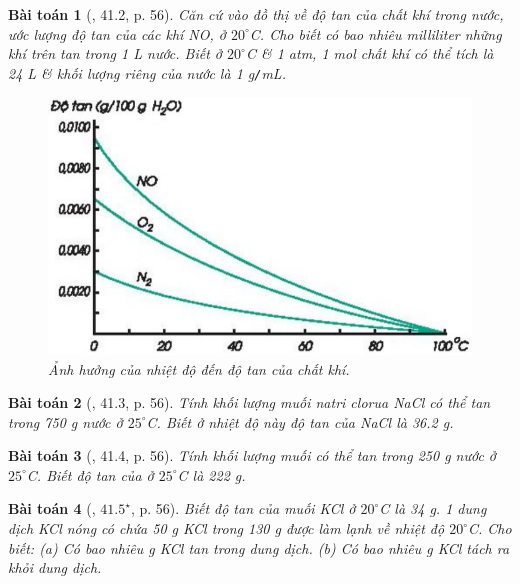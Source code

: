 \documentclass{article}
\newtheorem{baitoan}{Bài toán}
\begin{document}
\begin{baitoan}[\cite{SBT_Hoa_Hoc_8}, 41.2, p. 56]
	Căn cứ vào đồ thị về độ tan của chất khí trong nước, ước lượng độ tan của các khí \emph{NO, } ở $20^\circ$\emph{C}. Cho biết có bao nhiêu milliliter những khí trên tan trong \emph{1 L} nước. Biết ở $20^\circ$\emph{C} \& \emph{1 atm, 1 mol} chất khí có thể tích là \emph{24 L} \& khối lượng riêng của nước là \emph{1 g\texttt{/}mL}.	
	\begin{figure}[H]
		\centering
		\includegraphics[scale=0.3]{nhiet_do_do_tan_chat_khi}
		\caption{Ảnh hưởng của nhiệt độ đến độ tan của chất khí.}
	\end{figure}
\end{baitoan}

\begin{baitoan}[\cite{SBT_Hoa_Hoc_8}, 41.3, p. 56]
	Tính khối lượng muối natri clorua \emph{NaCl} có thể tan trong \emph{750 g} nước ở $25^\circ$\emph{C}. Biết ở nhiệt độ này độ tan của \emph{NaCl} là \emph{36.2 g}.
\end{baitoan}

\begin{baitoan}[\cite{SBT_Hoa_Hoc_8}, 41.4, p. 56]
	Tính khối lượng muối \emph{} có thể tan trong \emph{250 g} nước ở $25^\circ$\emph{C}. Biết độ tan của \emph{} ở $25^\circ$\emph{C} là \emph{222 g}.
\end{baitoan}

\begin{baitoan}[\cite{SBT_Hoa_Hoc_8}, $41.5^\star$, p. 56]
	Biết độ tan của muối \emph{KCl} ở 	$20^\circ$\emph{C} là \emph{34 g}. 1 dung dịch \emph{KCl} nóng có chứa \emph{50 g KCl} trong \emph{130 g } được làm lạnh về nhiệt độ $20^\circ$\emph{C}. Cho biết: (a) Có bao nhiêu \emph{g KCl} tan trong dung dịch. (b) Có bao nhiêu \emph{g KCl} tách ra khỏi dung dịch.
\end{baitoan}
\end{document}
